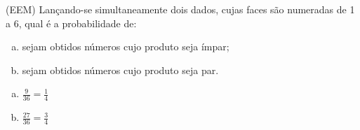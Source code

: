 \begin{ex}
(EEM) Lançando-se simultaneamente dois dados, cujas faces são numeradas de 1 a 6, qual é a probabilidade de:
   \begin{enumerate}[(a)]
   \item sejam obtidos números cujo produto seja ímpar;
   \item sejam obtidos números cujo produto seja par.
   \end{enumerate} 
     \begin{sol}
      \phantom{A}
       \begin{enumerate} [(a)]
           \item $\frac{9}{36}=\frac{1}{4}$
           \item $\frac{27}{36}=\frac{3}{4}$
       \end{enumerate}
     \end{sol}

\end{ex}